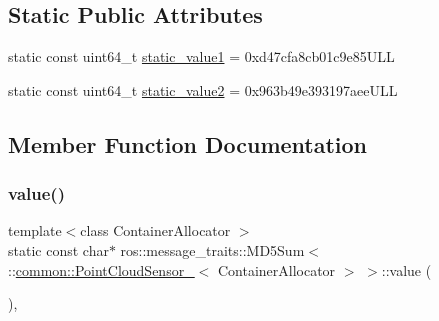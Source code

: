 \subsection*{Static Public Attributes}
\begin{DoxyCompactItemize}
\item 
static const uint64\+\_\+t \hyperlink{structros_1_1message__traits_1_1MD5Sum_3_01_1_1common_1_1PointCloudSensor___3_01ContainerAllocator_01_4_01_4_a60470bf5e1109eb0b4546bbcf3958e09}{static\+\_\+value1} = 0xd47cfa8cb01c9e85\+U\+LL
\item 
static const uint64\+\_\+t \hyperlink{structros_1_1message__traits_1_1MD5Sum_3_01_1_1common_1_1PointCloudSensor___3_01ContainerAllocator_01_4_01_4_ae4d8d8d225afd347ea80d9fa82f7064d}{static\+\_\+value2} = 0x963b49e393197aee\+U\+LL
\end{DoxyCompactItemize}


\subsection{Member Function Documentation}
\mbox{\label{structros_1_1message__traits_1_1MD5Sum_3_01_1_1common_1_1PointCloudSensor___3_01ContainerAllocator_01_4_01_4_a6f31f47bdf7c7259487b86f94e829572}} 
\subsubsection{\texorpdfstring{value()}{value()}\hspace{0.1cm}{\footnotesize\ttfamily [1/2]}}
{\footnotesize\ttfamily template$<$class Container\+Allocator $>$ \\
static const char$\ast$ ros\+::message\+\_\+traits\+::\+M\+D5\+Sum$<$ \+::\hyperlink{structcommon_1_1PointCloudSensor__}{common\+::\+Point\+Cloud\+Sensor\+\_\+}$<$ Container\+Allocator $>$ $>$\+::value (\begin{DoxyParamCaption}{ }\end{DoxyParamCaption})\hspace{0.3cm}{\ttfamily [inline]}, {\ttfamily [static]}}

